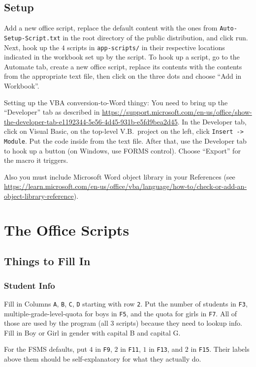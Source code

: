 \documentclass[openany,notitlepage]{book}
\begin{document}
	\section{Setup}
	
	Add a new office script, replace the default content with the ones from \verb|Auto-Setup-Script.txt| in the root
	directory of the public distribution, and click run. Next, hook up the $4$
	scripts in \verb|app-scripts/| in their respective locations indicated in the workbook set up by the script. To hook up a script, go to the Automate tab, create a new office script, replace its contents with the contents from the appropriate text file, then click on the three dots and choose ``Add in Workbook''.
	
	Setting up the VBA conversion-to-Word thingy: You need to bring up the ``Developer'' tab as described in
	\url{https://support.microsoft.com/en-us/office/show-the-developer-tab-e1192344-5e56-4d45-931b-e5fd9bea2d45}.
	In the Developer tab, click on Visual Basic, on the top-level V.B.\ project on the left, click \texttt{Insert -> Module}. Put the
	code inside from the text file. After that, use the Developer tab to hook up a button (on Windows, use FORMS control).
	Choose ``Export'' for the macro it triggers.
	
	Also you must include Microsoft Word object library in your References (see \url{https://learn.microsoft.com/en-us/office/vba/language/how-to/check-or-add-an-object-library-reference}).
	\chapter{The Office Scripts}
	\section{Things to Fill In}
	\subsection{Student Info}\label{inf}
	Fill in Columns \verb|A|, \verb|B|, \verb|C|, \verb|D| starting with row \verb|2|. Put the number of students in \verb|F3|,
	multiple-grade-level-quota for boys in \verb|F5|, and the quota for girls in \verb|F7|. All of those are used by the
	program (all $3$ scripts) because they need to lookup info. Fill in Boy or Girl in gender with capital B and capital G.
	
	For the FSMS defaults, put $4$ in \verb|F9|, $2$ in \verb|F11|, $1$ in \verb|F13|, and $2$ in \verb|F15|. Their labels above them
	should be self-explanatory for what they actually do.
\end{document}
